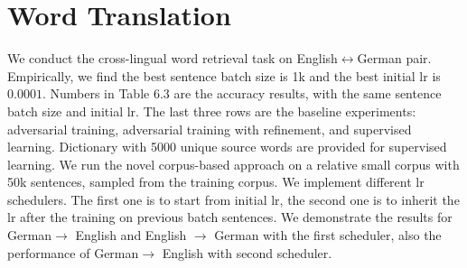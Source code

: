 \section{Word Translation}
We conduct the cross-lingual word retrieval task on English$\leftrightarrow$German pair. Empirically, we find the best sentence batch size is 1k and the best initial lr is $0.0001$. Numbers in Table 6.3 are the accuracy results, with the same sentence batch size and initial lr. The last three rows are the baseline experiments: adversarial training, adversarial training with refinement, and supervised learning. Dictionary with 5000 unique source words are provided for supervised learning. We run the novel corpus-based approach on a relative small corpus with 50k sentences, sampled from the training corpus. We implement  different lr schedulers. The first one is to start from initial lr, the second one is to inherit the lr after the training on previous batch sentences. We demonstrate the results for German$\rightarrow$ English and English $\rightarrow$ German with the first scheduler, also the performance of  German$\rightarrow$ English with second scheduler.

